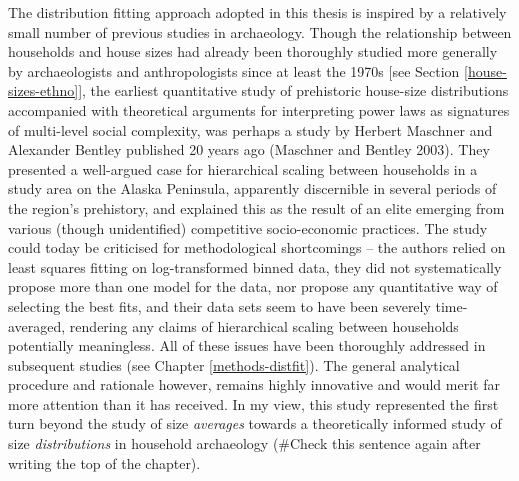 \documentclass[
  12pt,
]{book}
\begin{document}
The distribution fitting approach adopted in this thesis is inspired by a relatively small number of previous studies in archaeology. Though the relationship between households and house sizes had already been thoroughly studied more generally by archaeologists and anthropologists since at least the 1970s {[}see Section \ref{house-sizes-ethno}{]}, the earliest quantitative study of prehistoric house-size distributions accompanied with theoretical arguments for interpreting power laws as signatures of multi-level social complexity, was perhaps a study by Herbert Maschner and Alexander Bentley published 20 years ago (Maschner and Bentley 2003). They presented a well-argued case for hierarchical scaling between households in a study area on the Alaska Peninsula, apparently discernible in several periods of the region's prehistory, and explained this as the result of an elite emerging from various (though unidentified) competitive socio-economic practices. The study could today be criticised for methodological shortcomings -- the authors relied on least squares fitting on log-transformed binned data, they did not systematically propose more than one model for the data, nor propose any quantitative way of selecting the best fits, and their data sets seem to have been severely time-averaged, rendering any claims of hierarchical scaling between households potentially meaningless. All of these issues have been thoroughly addressed in subsequent studies (see Chapter \ref{methods-distfit}). The general analytical procedure and rationale however, remains highly innovative and would merit far more attention than it has received. In my view, this study represented the first turn beyond the study of size \emph{averages} towards a theoretically informed study of size \emph{distributions} in household archaeology (\#Check this sentence again after writing the top of the chapter).
\end{document}
